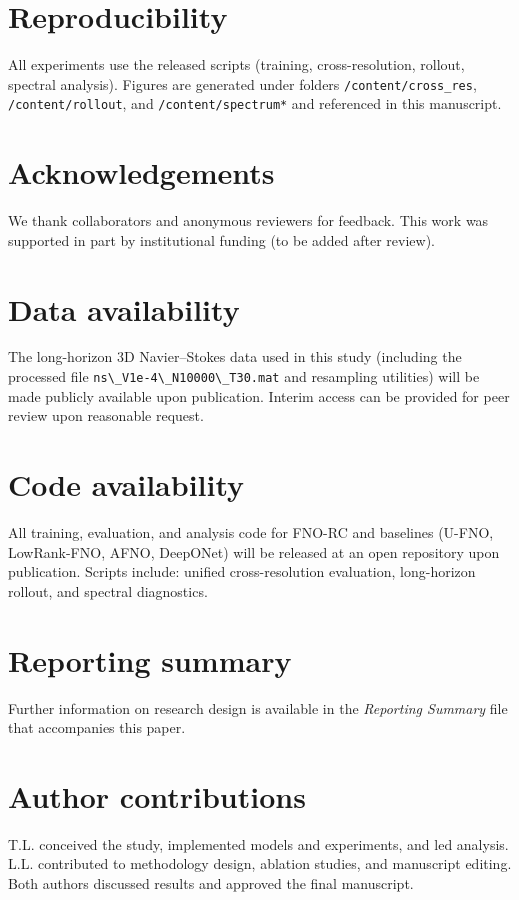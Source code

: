 \documentclass[11pt]{article}
\begin{document}
\section{Reproducibility}
All experiments use the released scripts (training, cross-resolution, rollout, spectral analysis). Figures are generated under folders \verb|/content/cross_res|, \verb|/content/rollout|, and \verb|/content/spectrum*| and referenced in this manuscript.

\section*{Acknowledgements}
We thank collaborators and anonymous reviewers for feedback. This work was supported in part by institutional funding (to be added after review).

\section*{Data availability}
The long-horizon 3D Navier--Stokes data used in this study (including the processed file \verb|ns\_V1e-4\_N10000\_T30.mat| and resampling utilities) will be made publicly available upon publication. Interim access can be provided for peer review upon reasonable request.

\section*{Code availability}
All training, evaluation, and analysis code for FNO-RC and baselines (U-FNO, LowRank-FNO, AFNO, DeepONet) will be released at an open repository upon publication. Scripts include: unified cross-resolution evaluation, long-horizon rollout, and spectral diagnostics.

\section*{Reporting summary}
Further information on research design is available in the \emph{Reporting Summary} file that accompanies this paper.

\section*{Author contributions}
T.L. conceived the study, implemented models and experiments, and led analysis. L.L. contributed to methodology design, ablation studies, and manuscript editing. Both authors discussed results and approved the final manuscript.
\end{document}
